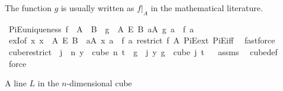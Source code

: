 \begin{isabellebody}
\begin{isamarkuptext}
The function $g$ is usually written as $f|_A$ in the mathematical literature.%
\end{isamarkuptext}\isamarkuptrue%
\isamarkupfalse%
\ PiE{\isacharunderscore}{\kern0pt}uniqueness{\isacharcolon}{\kern0pt}\ {\isachardoublequoteopen}f\ {\isacharbackquote}{\kern0pt}\ A\ {\isasymsubseteq}\ B\ {\isasymLongrightarrow}\ {\isasymexists}{\isacharbang}{\kern0pt}g\ {\isasymin}\ A\ {\isasymrightarrow}\isactrlsub E\ B{\isachardot}{\kern0pt}\ {\isasymforall}a{\isasymin}A{\isachardot}{\kern0pt}\ g\ a\ {\isacharequal}{\kern0pt}\ f\ a{\isachardoublequoteclose}\isanewline
%
\isadelimproof
\ \ %
\endisadelimproof
%
\isatagproof
{}\isamarkupfalse%
\ exI{\isacharbrackleft}{\kern0pt}of\ {\isachardoublequoteopen}{\isasymlambda}x{\isachardot}{\kern0pt}\ x\ {\isasymin}\ A\ {\isasymrightarrow}\isactrlsub E\ B\ {\isasymand}\ {\isacharparenleft}{\kern0pt}{\isasymforall}a{\isasymin}A{\isachardot}{\kern0pt}\ x\ a\ {\isacharequal}{\kern0pt}\ f\ a{\isacharparenright}{\kern0pt}{\isachardoublequoteclose}\ {\isachardoublequoteopen}restrict\ f\ A{\isachardoublequoteclose}{\isacharbrackright}{\kern0pt}\ PiE{\isacharunderscore}{\kern0pt}ext\ PiE{\isacharunderscore}{\kern0pt}iff\ \isamarkupfalse%
\ fastforce%
\endisatagproof
{\isafoldproof}%
%
\isadelimproof
\isanewline
%
\endisadelimproof
\isanewline
\isanewline
{}\isamarkupfalse%
\ cube{\isacharunderscore}{\kern0pt}restrict{\isacharcolon}{\kern0pt}\ \ {\isachardoublequoteopen}j\ {\isacharless}{\kern0pt}\ n{\isachardoublequoteclose}\ {\isachardoublequoteopen}y\ {\isasymin}\ cube\ n\ t{\isachardoublequoteclose}\ \ {\isachardoublequoteopen}{\isacharparenleft}{\kern0pt}{\isasymlambda}g\ {\isasymin}\ {\isacharbraceleft}{\kern0pt}{\isachardot}{\kern0pt}{\isachardot}{\kern0pt}{\isacharless}{\kern0pt}j{\isacharbraceright}{\kern0pt}{\isachardot}{\kern0pt}\ y\ g{\isacharparenright}{\kern0pt}\ {\isasymin}\ cube\ j\ t{\isachardoublequoteclose}%
\isadelimproof
\ %
\endisadelimproof
%
\isatagproof
{}\isamarkupfalse%
\ assms\ \isamarkupfalse%
\ cube{\isacharunderscore}{\kern0pt}def\ \isamarkupfalse%
\ force%
\endisatagproof
{\isafoldproof}%
%
\isadelimproof
%
\endisadelimproof
%
\begin{isamarkuptext}%
A line $L$ in the $n$-dimensional cube


\end{isamarkuptext}
\end{isabellebody}
